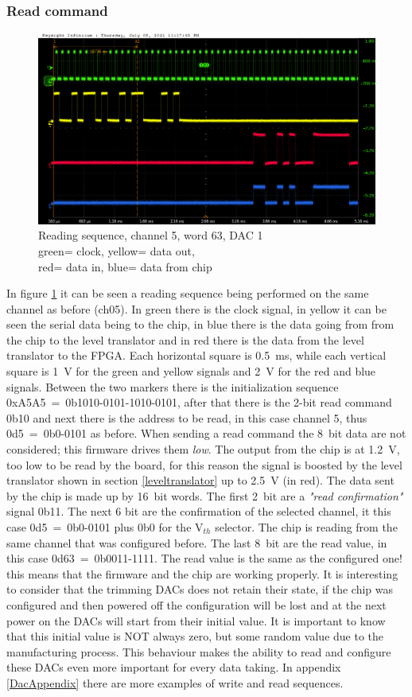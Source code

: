 \subsubsection{Read command}
\begin{figure}[H]
	\centering
	\includegraphics[width=0.7\linewidth]{IMG/ch5/probe/09-08-2021_ch05-read63-baselinedac1}
	\caption{Reading sequence, channel 5, word 63, DAC 1\\{\color{green}green}= clock, {\color{yellow}yellow}= data out,\\{\color{red}red}= data in, {\color{blue}blue}= data from chip}
	\label{fig:ch05read63}
\end{figure}
\noindent In figure \ref{fig:ch05read63} it can be seen a reading sequence being performed on the same channel as before (ch05).
In green there is the clock signal, in yellow it can be seen the serial data being to the chip, in blue there is the data going from from the chip to the level translator and in red there is the data from the level translator to the FPGA.
Each horizontal square is 0.5~ms, while each vertical square is 1~V for the green and yellow signals and 2~V for the red and blue signals.
Between the two markers there is the initialization sequence 0xA5A5~=~0b1010-0101-1010-0101, after that there is the 2-bit read command 0b10 and next there is the address to be read, in this case channel 5, thus 0d5~=~0b0-0101 as before.
When sending a read command the 8~bit data are not considered; this firmware drives them \textit{low}.
The output from the chip is at 1.2~V, too low to be read by the board, for this reason the signal is boosted by the level translator shown in section \ref{leveltranslator} up to 2.5~V (in red).
The data sent by the chip is made up by 16~bit words. The first 2~bit are a \textit{"read confirmation"} signal 0b11. The next 6 bit are the confirmation of the selected channel, it this case 0d5~=~0b0-0101 plus 0b0 for the V$_{th}$ selector.
The chip is reading from the same channel that was configured before.
The last 8~bit are the read value, in this case 0d63~=~0b0011-1111.
The read value is the same as the configured one! this means that the firmware and the chip are working properly.
It is interesting to consider that the trimming DACs does not retain their state, if the chip was configured and then powered off the configuration will be lost and at the next power on the DACs will start from their initial value.
It is important to know that this initial value is NOT always zero, but some random value due to the manufacturing process.
This behaviour makes the ability to read and configure these DACs even more important for every data taking. In appendix \ref{DacAppendix} there are more examples of write and read sequences. 
